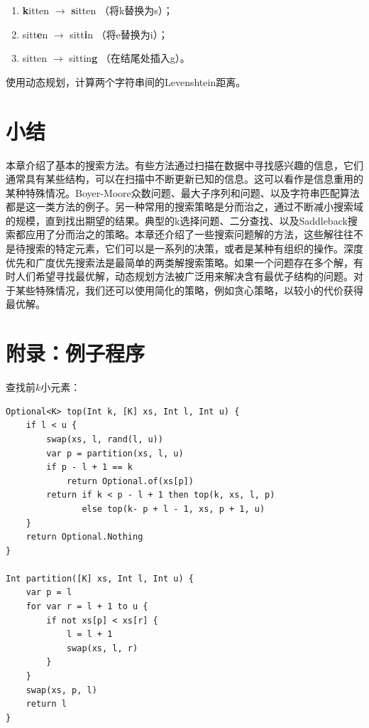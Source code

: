 \documentclass[b5paper]{ctexart}
\begin{document}
\begin{Exercise}
\begin{itemize}
  \begin{enumerate}
  \item \textbf{k}itten $\rightarrow$ \textbf{s}itten （将k替换为s）；
  \item sitt\textbf{e}n $\rightarrow$ sitt\textbf{i}n （将e替换为i）；
  \item sitten $\rightarrow$ sittin\textbf{g} （在结尾处插入g）。
  \end{enumerate}
使用动态规划，计算两个字符串间的Levenshtein距离。
\end{itemize}
\end{Exercise}

\section{小结}

本章介绍了基本的搜索方法。有些方法通过扫描在数据中寻找感兴趣的信息，它们通常具有某些结构，可以在扫描中不断更新已知的信息。这可以看作是信息重用的某种特殊情况。Boyer-Moore众数问题、最大子序列和问题、以及字符串匹配算法都是这一类方法的例子。另一种常用的搜索策略是分而治之，通过不断减小搜索域的规模，直到找出期望的结果。典型的k选择问题、二分查找、以及Saddleback搜索都应用了分而治之的策略。本章还介绍了一些搜索问题解的方法，这些解往往不是待搜索的特定元素，它们可以是一系列的决策，或者是某种有组织的操作。深度优先和广度优先搜索法是最简单的两类解搜索策略。如果一个问题存在多个解，有时人们希望寻找最优解，动态规划方法被广泛用来解决含有最优子结构的问题。对于某些特殊情况，我们还可以使用简化的策略，例如贪心策略，以较小的代价获得最优解。

\section{附录：例子程序}

查找前$k$小元素：

\begin{lstlisting}[language = Bourbaki]
Optional<K> top(Int k, [K] xs, Int l, Int u) {
    if l < u {
        swap(xs, l, rand(l, u))
        var p = partition(xs, l, u)
        if p - l + 1 == k
            return Optional.of(xs[p])
        return if k < p - l + 1 then top(k, xs, l, p)
               else top(k- p + l - 1, xs, p + 1, u)
    }
    return Optional.Nothing
}

Int partition([K] xs, Int l, Int u) {
    var p = l
    for var r = l + 1 to u {
        if not xs[p] < xs[r] {
            l = l + 1
            swap(xs, l, r)
        }
    }
    swap(xs, p, l)
    return l
}
\end{lstlisting}
\end{document}
